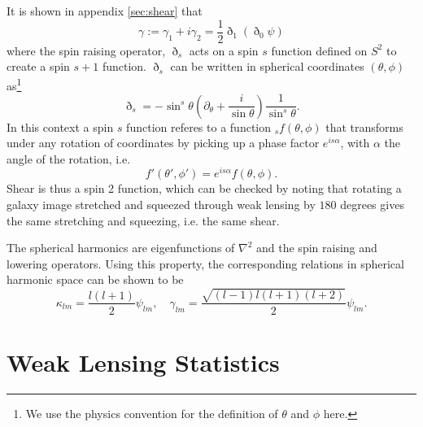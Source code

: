 \documentclass[11pt]{article} %
\begin{document}
It is shown in appendix \ref{sec:shear} that
\begin{equation}
    \gamma := \gamma_1 + i\gamma_2 = \frac{1}{2}\eth_1(\eth_0\psi)
\end{equation}
where the spin raising operator, $\eth_s$ acts on a spin $s$ function defined on $S^2$ to create a spin $s+1$ function.
$\eth_s$ can be written in spherical coordinates $(\theta, \phi)$ as\footnote{We use the physics convention for the definition of $\theta$ and $\phi$ here.}
\begin{equation}
    \eth_s = -\sin^s\theta(\partial_\theta + \frac{i}{\sin\theta})\frac{1}{\sin^s\theta}.
\end{equation}
In this context a spin $s$ function referes to a function $_sf(\theta, \phi)$ that transforms under any rotation of coordinates by picking up a phase factor $e^{is\alpha}$, with $\alpha$ the angle of the rotation, i.e.
\begin{equation}
    f'(\theta', \phi') = e^{is\alpha}f(\theta, \phi).
\end{equation}
Shear is thus a spin 2 function, which can be checked by noting that rotating a galaxy image stretched and squeezed through weak lensing by $180$ degrees gives the same stretching and squeezing, i.e. the same shear.

The spherical harmonics are eigenfunctions of $\nabla^2$ and the spin raising and lowering operators. Using this property, the corresponding relations in spherical harmonic space can be shown to be 
\begin{equation*}
    \kappa_{lm} = \frac{l(l+1)}{2}\psi_{lm}, \quad \gamma_{lm} = \frac{\sqrt{(l-1)l(l+1)(l+2)}}{2} \psi_{lm}.
\end{equation*}

\section{Weak Lensing Statistics}\label{sec:weaklensstats}
\end{document}
